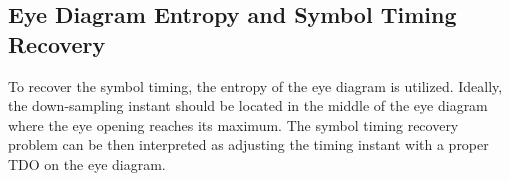 \documentclass[journal,comsoc, onecolumn, 12pt,draftclsnofoot]{IEEEtran} %
\begin{document}
\subsection{Eye Diagram Entropy and Symbol Timing Recovery}
\label{sec:eye_entp}
To recover the symbol timing, the entropy of the eye diagram is utilized. 
Ideally, the down-sampling instant should be located in the middle of the eye diagram where the eye opening reaches its maximum.
The symbol timing recovery problem can be then interpreted as adjusting the timing instant with a proper TDO on the eye diagram.
\end{document}
